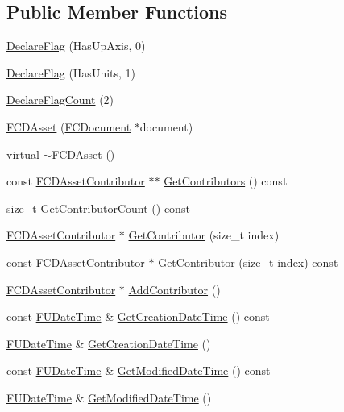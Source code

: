 \subsection*{Public Member Functions}
\begin{DoxyCompactItemize}
\item 
\hyperlink{classFCDAsset_aaef444871208dc4fa7844faae9934a28}{DeclareFlag} (HasUpAxis, 0)
\item 
\hyperlink{classFCDAsset_a1d93c654b9349d0bdcb1908d6913acbf}{DeclareFlag} (HasUnits, 1)
\item 
\hyperlink{classFCDAsset_a570cdb41df882da6b1870d1fc2a832c4}{DeclareFlagCount} (2)
\item 
\hyperlink{classFCDAsset_a5da15a3a94d6a7f59f45c61867ec5bc0}{FCDAsset} (\hyperlink{classFCDocument}{FCDocument} $\ast$document)
\item 
virtual \hyperlink{classFCDAsset_ac42df2e17abd0b486487fe81eae943f6}{$\sim$FCDAsset} ()
\item 
const \hyperlink{classFCDAssetContributor}{FCDAssetContributor} $\ast$$\ast$ \hyperlink{classFCDAsset_a2513997b4e76d1c0b0372e5038b14fdd}{GetContributors} () const 
\item 
size\_\-t \hyperlink{classFCDAsset_ac155201e474e73fae72f6a311b75fabe}{GetContributorCount} () const 
\item 
\hyperlink{classFCDAssetContributor}{FCDAssetContributor} $\ast$ \hyperlink{classFCDAsset_af880150aa707a2c0d01650cf06cdcd0e}{GetContributor} (size\_\-t index)
\item 
const \hyperlink{classFCDAssetContributor}{FCDAssetContributor} $\ast$ \hyperlink{classFCDAsset_a1fc0c9b2045afaebef1c1ddab603b910}{GetContributor} (size\_\-t index) const 
\item 
\hyperlink{classFCDAssetContributor}{FCDAssetContributor} $\ast$ \hyperlink{classFCDAsset_a38a74fe254c1973e4168cbb7dc6ac8c4}{AddContributor} ()
\item 
const \hyperlink{classFUDateTime}{FUDateTime} \& \hyperlink{classFCDAsset_aca09b308ca564bfc2f46b7e1e2a9fd8f}{GetCreationDateTime} () const 
\item 
\hyperlink{classFUDateTime}{FUDateTime} \& \hyperlink{classFCDAsset_ac6b536eed591166e36ce17e872cb4590}{GetCreationDateTime} ()
\item 
const \hyperlink{classFUDateTime}{FUDateTime} \& \hyperlink{classFCDAsset_a76a1f0b10d0b9584769426a5c6364914}{GetModifiedDateTime} () const 
\item 
\hyperlink{classFUDateTime}{FUDateTime} \& \hyperlink{classFCDAsset_aa9cb70c621809bcc5c21ce46f0337572}{GetModifiedDateTime} ()
$$
\end{DoxyCompactItemize}
